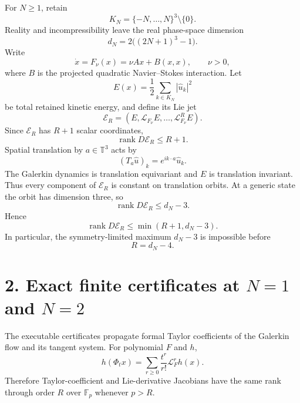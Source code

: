 \documentclass[10pt,leqno,twoside]{article}
\newcommand{\T}{\mathbb T}
\newcommand{\F}{\mathbb F}
\newcommand{\Lie}{\mathcal L}
\newcommand{\uHat}{\widehat u}
\theoremstyle{plain}
\theoremstyle{remark}
\begin{document}
For $N\ge1$, retain
\begin{equation}
K_N=\{-N,\ldots,N\}^3\setminus\{0\}.
\end{equation}
Reality and incompressibility leave the real phase-space dimension
\begin{equation}
\boxed{d_N=2\bigl((2N+1)^3-1\bigr).}
\end{equation}
Write
\begin{equation}
\dot x=F_\nu(x)=\nu Ax+B(x,x),\qquad \nu>0,
\end{equation}
where $B$ is the projected quadratic Navier--Stokes interaction.  Let
\begin{equation}
E(x)=\frac12\sum_{k\in K_N}|\uHat_k|^2
\end{equation}
be total retained kinetic energy, and define its Lie jet
\begin{equation}
\mathcal E_R=(E,\Lie_{F_\nu}E,\ldots,\Lie_{F_\nu}^{R}E).
\end{equation}
Since $\mathcal E_R$ has $R+1$ scalar coordinates,
\begin{equation}
\operatorname{rank}D\mathcal E_R\le R+1.
\end{equation}
Spatial translation by $a\in\T^3$ acts by
\begin{equation}
(T_a\uHat)_k=e^{ik\cdot a}\uHat_k.
\end{equation}
The Galerkin dynamics is translation equivariant and $E$ is translation invariant.  Thus
every component of $\mathcal E_R$ is constant on translation orbits.  At a generic state the
orbit has dimension three, so
\begin{equation}
\operatorname{rank}D\mathcal E_R\le d_N-3.
\end{equation}
Hence
\begin{equation}
\boxed{\operatorname{rank}D\mathcal E_R\le\min(R+1,d_N-3).}
\end{equation}
In particular, the symmetry-limited maximum $d_N-3$ is impossible before
\begin{equation}
\boxed{R=d_N-4.}
\end{equation}

\section*{2. Exact finite certificates at $N=1$ and $N=2$}

The executable certificates propagate formal Taylor coefficients of the Galerkin flow and its
tangent system.  For polynomial $F$ and $h$,
\begin{equation}
h(\Phi_t x)=\sum_{r\ge0}\frac{t^r}{r!}\Lie_F^rh(x).
\end{equation}
Therefore Taylor-coefficient and Lie-derivative Jacobians have the same rank through order
$R$ over $\F_p$ whenever $p>R$.
\end{document}
